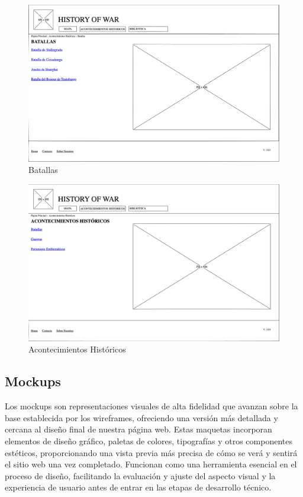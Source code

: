 \documentclass{article}
\begin{document}
\begin{figure}[H]
    \centering
    \includegraphics[width=1\textwidth]{Wireframes/Batallas.jpg}
    \caption{Batallas}
    \label{fig:mi_imagen}
\end{figure}

\begin{figure}[H]
    \centering
    \includegraphics[width=1\textwidth]{Wireframes/AH.jpg}
    \caption{Acontecimientos Históricos}
    \label{fig:mi_imagen}
\end{figure}

\subsection{Mockups}

Los mockups son representaciones visuales de alta fidelidad que avanzan sobre la base establecida por los wireframes, ofreciendo una versión más detallada y cercana al diseño final de nuestra página web. Estas maquetas incorporan elementos de diseño gráfico, paletas de colores, tipografías y otros componentes estéticos, proporcionando una vista previa más precisa de cómo se verá y sentirá el sitio web una vez completado. Funcionan como una herramienta esencial en el proceso de diseño, facilitando la evaluación y ajuste del aspecto visual y la experiencia de usuario antes de entrar en las etapas de desarrollo técnico.
\end{document}
